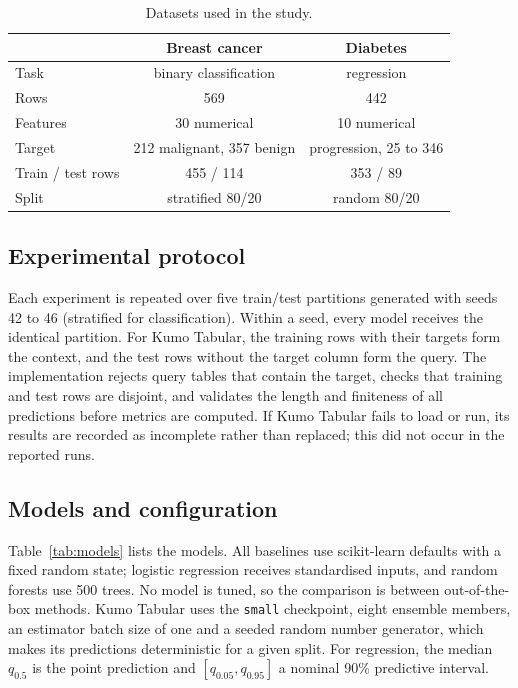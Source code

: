 \documentclass{ieeeaccess}
\begin{document}
\begin{table}[t]
\centering
\caption{Datasets used in the study.}
\label{tab:datasets}
\setlength{\tabcolsep}{4pt}
\begin{tabular}{lcc}
\toprule
& Breast cancer \cite{street1993nuclear} & Diabetes \cite{efron2004lars} \\
\midrule
Task & binary classification & regression \\
Rows & 569 & 442 \\
Features & 30 numerical & 10 numerical \\
Target & 212 malignant, 357 benign & progression, 25 to 346 \\
Train / test rows & 455 / 114 & 353 / 89 \\
Split & stratified 80/20 & random 80/20 \\
\bottomrule
\end{tabular}
\end{table}

\subsection{Experimental protocol}
Each experiment is repeated over five train/test partitions generated with seeds 42 to 46 (stratified for classification). Within a seed, every model receives the identical partition. For Kumo Tabular, the training rows with their targets form the context, and the test rows without the target column form the query. The implementation rejects query tables that contain the target, checks that training and test rows are disjoint, and validates the length and finiteness of all predictions before metrics are computed. If Kumo Tabular fails to load or run, its results are recorded as incomplete rather than replaced; this did not occur in the reported runs.

\subsection{Models and configuration}
Table~\ref{tab:models} lists the models. All baselines use scikit-learn defaults with a fixed random state; logistic regression receives standardised inputs, and random forests use 500 trees. No model is tuned, so the comparison is between out-of-the-box methods. Kumo Tabular uses the \texttt{small} checkpoint, eight ensemble members, an estimator batch size of one and a seeded random number generator, which makes its predictions deterministic for a given split. For regression, the median $q_{0.5}$ is the point prediction and $[q_{0.05},q_{0.95}]$ a nominal 90\% predictive interval.
\end{document}
